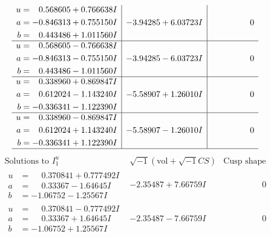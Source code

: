 \documentclass[1p]{elsarticle_modified}
\theoremstyle{definition}
\newcommand{\I}{\sqrt{-1}}
\begin{document}
$$\begin{array}{c|c|c}
\begin{aligned}
u &= \phantom{-}0.568605 + 0.766638 I \\
a &= -0.846313 + 0.755150 I \\
b &= \phantom{-}0.443486 + 1.011560 I\end{aligned}
 & -3.94285 + 6.03723 I & \phantom{-0.000000 } 0 \\ \hline\begin{aligned}
u &= \phantom{-}0.568605 - 0.766638 I \\
a &= -0.846313 - 0.755150 I \\
b &= \phantom{-}0.443486 - 1.011560 I\end{aligned}
 & -3.94285 - 6.03723 I & \phantom{-0.000000 } 0 \\ \hline\begin{aligned}
u &= \phantom{-}0.338960 + 0.869847 I \\
a &= \phantom{-}0.612024 - 1.143240 I \\
b &= -0.336341 - 1.122390 I\end{aligned}
 & -5.58907 + 1.26010 I & \phantom{-0.000000 } 0 \\ \hline\begin{aligned}
u &= \phantom{-}0.338960 - 0.869847 I \\
a &= \phantom{-}0.612024 + 1.143240 I \\
b &= -0.336341 + 1.122390 I\end{aligned}
 & -5.58907 - 1.26010 I & \phantom{-0.000000 } 0\\
 \hline 
 \end{array}$$\newpage$$\begin{array}{c|c|c}  
\text{Solutions to }I^u_{1}& \I (\text{vol} + \sqrt{-1}CS) & \text{Cusp shape}\\
 \hline 
\begin{aligned}
u &= \phantom{-}0.370841 + 0.777492 I \\
a &= \phantom{-}0.33367 - 1.64645 I \\
b &= -1.06752 - 1.25567 I\end{aligned}
 & -2.35487 + 7.66759 I & \phantom{-0.000000 } 0 \\ \hline\begin{aligned}
u &= \phantom{-}0.370841 - 0.777492 I \\
a &= \phantom{-}0.33367 + 1.64645 I \\
b &= -1.06752 + 1.25567 I\end{aligned}
 & -2.35487 - 7.66759 I & \phantom{-0.000000 } 0 \\ \hline\begin{aligned}

\end{aligned}
\end{array}$$
\end{document}

